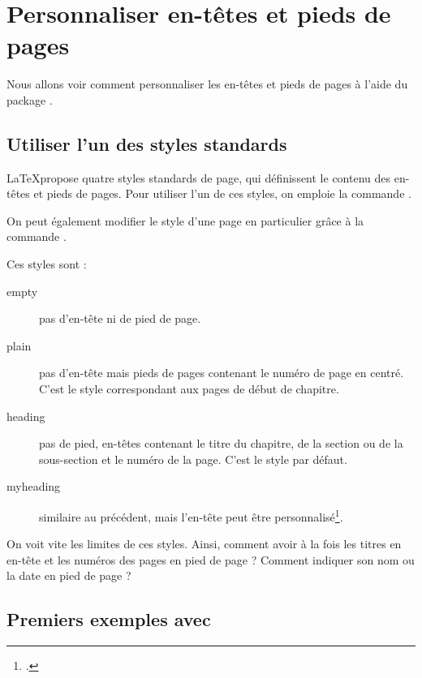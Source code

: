 \chapter{Personnaliser en-têtes et pieds de pages}\label{entete}

\begin{intro}
Nous allons voir comment personnaliser les en-têtes et pieds de pages à l'aide du package .
\end{intro}


\section{Utiliser l'un des styles standards}\label{stylesentete}

\LaTeX propose quatre styles standards de page, qui définissent le contenu des en-têtes et pieds de pages. Pour utiliser l'un de ces styles, on emploie  la commande .


On peut également modifier le style d'une page en particulier grâce à la commande .

Ces styles sont :
\begin{description}
\item[empty] pas d'en-tête ni de pied de page.
\item[plain] pas d'en-tête mais pieds de pages contenant le numéro de page en centré. C'est le style correspondant aux pages de début de chapitre. 
\item[heading] pas de pied, en-têtes contenant le titre du chapitre, de la section ou de la sous-section et le numéro de la page. C'est le style par défaut. \label{styleentetes}
\item[myheading] similaire au précédent, mais l'en-tête peut être personnalisé\footcite[Nous tenons cette information du manuel de][\pno~222, qui ne précise pas comment faire]{latex_companion}.
\end{description}



On voit vite les limites de ces styles. Ainsi, comment  avoir à la fois les titres en en-tête et les numéros des pages en pied de page ? Comment indiquer son nom ou la date en pied de page ?

\section{Premiers exemples avec }

